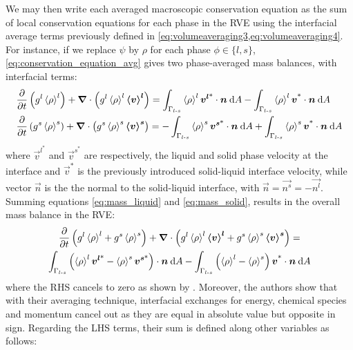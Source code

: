 We may then write each averaged macroscopic conservation
equation as the sum of local conservation equations for each phase in the RVE using the interfacial average terms previously defined in \cref{eq:volumeaveraging3,eq:volumeaveraging4}.
For instance, if we replace $\psi$ by $\rho$ for each phase $\phi \in \{l,s\}$, \cref{eq:conservation_equation_avg} 
gives two phase-averaged mass balances, with interfacial terms:
\begin{subequations}
\begin{align}
\label{eq:mass_liquid}
& \temp{\gl \rhol} + \nabvec \cdot \brac{\gl \rhol \vl} =
  \integral{\Gamma_{\liqsol}}{\rhol \vlstar \cdot \vec{n}}{A} - \integral{\Gamma_{\liqsol}}{\rhol \vstar \cdot \vec{n}}{A} \\
\label{eq:mass_solid}
& \temp{\gs \rhos} + \nabvec \cdot \brac{\gs \rhos \vs} = -\integral{\Gamma_{\liqsol}}{\rhos \vsstar \cdot \vec{n}}{A} + \integral{\Gamma_{\liqsol}}{\rhos \vstar \cdot \vec{n}}{A}
\end{align}
\end{subequations}
where $\vec{v}^{l^*}$ and $\vec{v}^{s^*}$ are respectively, the liquid 
and solid phase velocity at the interface and $\vec{v}^*$ is the previously introduced solid-liquid interface velocity, while vector $\vec{n}$ is the the normal to the solid-liquid interface, with $\vec{n}=\vec{n^s}=-\vec{n^l}$.
Summing equations \eqref{eq:mass_liquid} and \eqref{eq:mass_solid}, results in the overall mass balance
in the RVE:
\begin{multline}
\label{eq:conservation_mass_local}
 \temp{\gl \rhol + \gs \rhos}  +  \nabvec \cdot \brac{\gl \rhol \vl + \gs \rhos \vs} = \\  
	  \integral{\Gamma_{\liqsol}}{\brac{\rhol \vlstar-\rhos \vsstar} \cdot \vec{n}}{A}
   -  \integral{\Gamma_{\liqsol}}{\brac{\rhol-\rhos} \vstar \cdot \vec{n}}{A}
\end{multline}
where the RHS cancels to zero as shown by \citet{ni_volume-averaged_1991}. Moreover, the authors show that with their averaging technique, 
interfacial exchanges for energy, chemical species and momentum cancel out as they are equal in absolute value but opposite in sign. 
Regarding the LHS terms, their sum is defined along other variables as follows:
